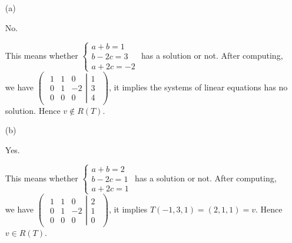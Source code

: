 \begin{Exercise}
\begin{enumerate}[(a)]
\item[(a)]
\begin{answer}
No.
\end{answer}
\begin{solution}
This means whether $\begin{cases}
a+b = 1 \\
b-2c = 3 \\
a+2c = -2
\end{cases}$ has a solution or not. After computing, we have
$\begin{pmatrix} \left.\begin{matrix}
1 & 1 & 0 \\
0 & 1 & -2 \\
0 & 0 & 0
\end{matrix} \right| \begin{matrix}
1 \\
3 \\
4
\end{matrix} \end{pmatrix}$, it implies the systems of linear equations has no solution. Hence $v\notin R(T)$.
\end{solution}

\item[(b)]
\begin{answer}
Yes.
\end{answer}
\begin{solution}
This means whether $\begin{cases}
a+b = 2\\
b-2c = 1 \\
a+2c = 1
\end{cases}$ has a solution or not. After computing, we have $\begin{pmatrix} \left.\begin{matrix}
1 & 1 & 0 \\
0 & 1 & -2 \\
0 & 0 & 0
\end{matrix} \right| \begin{matrix}
2 \\
1 \\
0
\end{matrix} \end{pmatrix}$, it implies $T(-1,3,1) = (2,1,1) = v$. Hence $v\in R(T)$.
\end{solution}

\end{enumerate}
\end{Exercise}